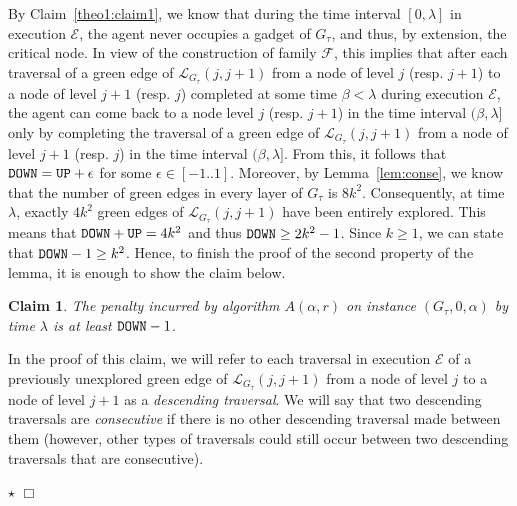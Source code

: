 \documentclass[11pt]{article}
\newtheorem{claim}{Claim}[section]
\newcommand{\qed}{\hfill $\Box$ \bigbreak}
\newenvironment{proof}{\noindent {\bf Proof.}}{\qed}
\newenvironment{proofclaim}{\noindent{\bf Proof of the claim.}}{\hfill$\star$}
\begin{document}
{\begin{proof}
By Claim~\ref{theo1:claim1}, we know that during the time interval $[0,\lambda]$ in execution $\mathcal{E}$, the agent never occupies a gadget of $G_{\tau}$, and thus, by extension, the critical node. In view of the construction of family $\mathcal{F}$, this implies that after each traversal of a green edge of $\mathcal{L}_{G_{\tau}}(j,j+1)$ from a node of level $j$ (resp. $j+1$) to a node of level $j+1$ (resp. $j$) completed at some time $\beta<\lambda$ during execution $\mathcal{E}$, the agent can come back to a node level $j$ (resp. $j+1$) in the time interval $(\beta,\lambda]$ only by completing the traversal of a green edge of $\mathcal{L}_{G_{\tau}}(j,j+1)$ from a node of level $j+1$ (resp. $j$) in the time interval $(\beta,\lambda]$. From this, it follows that ${\tt DOWN}={\tt UP}+ \epsilon$ for some $\epsilon\in[-1..1]$. Moreover, by Lemma~\ref{lem:conse}, we know that the number of green edges in every layer of $G_{\tau}$ is $8k^2$. Consequently, at time $\lambda$, exactly $4k^2$ green edges of $\mathcal{L}_{G_{\tau}}(j,j+1)$ have been entirely explored. This means that ${\tt DOWN}+{\tt UP}=4k^2$ and thus ${\tt DOWN}\geq 2k^2-1$. Since $k 
\geq 1$, we can state that  ${\tt DOWN}-1\geq k^2$. Hence, to finish the proof of the second property of the lemma, it is enough to show the claim below.

\begin{claim}
\label{theo1:claim3}
The penalty incurred by algorithm $A(\alpha,r)$ on instance $(G_{\tau},0,\alpha)$ by time $\lambda$ is at least  ${\tt DOWN}-1$.
\end{claim}

\begin{proofclaim}
In the proof of this claim, we will refer to each traversal in execution $\mathcal{E}$ of a previously unexplored green edge of $\mathcal{L}_{G_{\tau}}(j,j+1)$ from a node of level $j$ to a node of level $j+1$ as a \emph{descending traversal}. We will say that two descending traversals are {\em consecutive} if there is no other descending traversal made between them (however, other types of traversals could still occur between two descending traversals that are consecutive).


\end{proofclaim}
\end{proof}}
\end{document}
